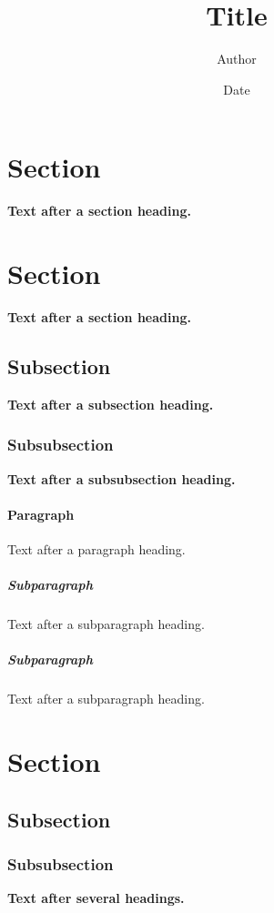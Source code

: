 \documentclass[10pt]{kharticle}
\title{Title}
\author{Author}
\date{Date}
\begin{document}
\maketitle

\begin{abstract}
\lipsum[1][1-15]
\end{abstract}

\section{Section}
\textbf{Text after a section heading.}
\lipsum[2-3]

\section{Section}
\textbf{Text after a section heading.}
\lipsum[4][1-10]

\subsection{Subsection}
\textbf{Text after a subsection heading.}
\lipsum[5][1-10]

\subsubsection{Subsubsection}
\textbf{Text after a subsubsection heading.}
\lipsum[5][1-10]

\paragraph{Paragraph}
Text after a paragraph heading.
\lipsum[5][1-10]

\subparagraph{Subparagraph}
Text after a subparagraph heading.
\lipsum[5][1-10]
\subparagraph{Subparagraph}
Text after a subparagraph heading.
\lipsum[5][1-10]


\section{Section}
\subsection{Subsection}
\subsubsection{Subsubsection}
\textbf{Text after several headings.}
\lipsum[6][1-10]
\end{document}
